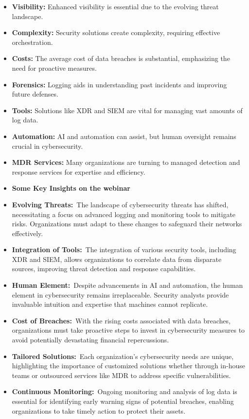 \begin{itemize}
    \item \textbf{Visibility:} Enhanced visibility is essential due to the evolving threat landscape.
    \item \textbf{Complexity:} Security solutions create complexity, requiring effective orchestration.
    \item \textbf{Costs:} The average cost of data breaches is substantial, emphasizing the need for proactive measures.
    \item \textbf{Forensics:} Logging aids in understanding past incidents and improving future defenses.
    \item \textbf{Tools:} Solutions like XDR and SIEM are vital for managing vast amounts of log data.
    \item \textbf{Automation:} AI and automation can assist, but human oversight remains crucial in cybersecurity.
    \item \textbf{MDR Services:} Many organizations are turning to managed detection and response services for expertise and efficiency.
    \item \textbf{Some Key Insights on the webinar}
    \item \textbf{Evolving Threats:} The landscape of cybersecurity threats has shifted, necessitating a focus on advanced logging and monitoring tools to mitigate risks. Organizations must adapt to these changes to safeguard their networks effectively.
    \item \textbf{Integration of Tools:} The integration of various security tools, including XDR and SIEM, allows organizations to correlate data from disparate sources, improving threat detection and response capabilities.
    \item \textbf{Human Element:} Despite advancements in AI and automation, the human element in cybersecurity remains irreplaceable. Security analysts provide invaluable intuition and expertise that machines cannot replicate.
    \item \textbf{Cost of Breaches:} With the rising costs associated with data breaches, organizations must take proactive steps to invest in cybersecurity measures to avoid potentially devastating financial repercussions.
    \item \textbf{Tailored Solutions:} Each organization’s cybersecurity needs are unique, highlighting the importance of customized solutions whether through in-house teams or outsourced services like MDR to address specific vulnerabilities.
\item \textbf{Continuous Monitoring:} Ongoing monitoring and analysis of log data is essential for identifying early warning signs of potential breaches, enabling organizations to take timely action to protect their assets.
\end{itemize}




